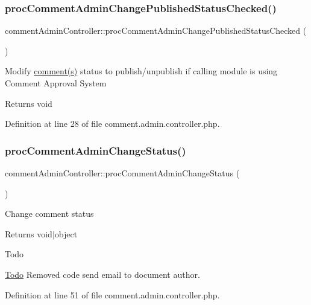 \subsubsection{\texorpdfstring{proc\+Comment\+Admin\+Change\+Published\+Status\+Checked()}{procCommentAdminChangePublishedStatusChecked()}}
{\footnotesize\ttfamily comment\+Admin\+Controller\+::proc\+Comment\+Admin\+Change\+Published\+Status\+Checked (\begin{DoxyParamCaption}{ }\end{DoxyParamCaption})}

Modify \hyperlink{classcomment}{comment(s)} status to publish/unpublish if calling module is using Comment Approval System \begin{DoxyReturn}{Returns}
void 
\end{DoxyReturn}


Definition at line 28 of file comment.\+admin.\+controller.\+php.

\hypertarget{classcommentAdminController_a70bde7bc9124b72df7bdf6bf09633148}{}\label{classcommentAdminController_a70bde7bc9124b72df7bdf6bf09633148} 
\subsubsection{\texorpdfstring{proc\+Comment\+Admin\+Change\+Status()}{procCommentAdminChangeStatus()}}
{\footnotesize\ttfamily comment\+Admin\+Controller\+::proc\+Comment\+Admin\+Change\+Status (\begin{DoxyParamCaption}{ }\end{DoxyParamCaption})}

Change comment status \begin{DoxyReturn}{Returns}
void$\vert$object 
\end{DoxyReturn}
\begin{DoxyRefDesc}{Todo}
\item[\hyperlink{todo__todo000005}{Todo}]Removed code send email to document author. \end{DoxyRefDesc}


Definition at line 51 of file comment.\+admin.\+controller.\+php.

\hypertarget{classcommentAdminController_ad62c47962884acf8b3a862f075b31343}{}\label{classcommentAdminController_ad62c47962884acf8b3a862f075b31343} 

